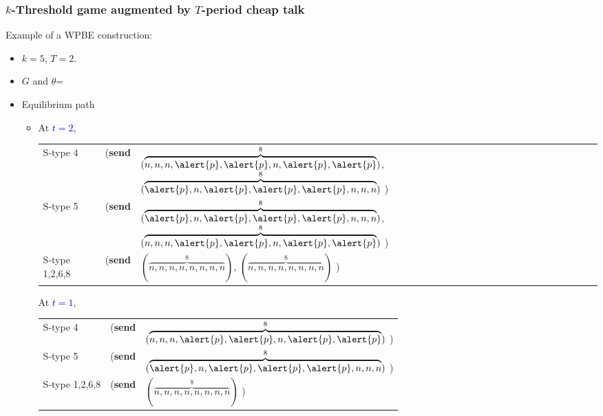 \documentclass[8pt]{beamer}
\begin{document}
\begin{frame}
  \frametitle{$k$-Threshold game augmented by $T$-period cheap talk}
Example of a WPBE construction:
\begin{itemize}
\item $k=5$, $T=2$.
\item $G$ and $\theta$=
\begin{center}
\end{center}
\end{itemize}

\begin{itemize}
\item Equilibrium path
\begin{itemize}
\item 
{}
{
At \textcolor{blue}{$t=2$}, 
\begin{table}[h]
\begin{tabular}{ll l}
S-type 4 & (\textbf{send} & $(\overbrace{n,n,n,\alert{p},\alert{p},n,\alert{p},\alert{p}}^{8})$, $(\overbrace{\alert{p},n,\alert{p},\alert{p},\alert{p},n,n,n}^{8})$ )\\
S-type 5 & (\textbf{send} & $(\overbrace{\alert{p},n,\alert{p},\alert{p},\alert{p},n,n,n}^{8})$, $(\overbrace{n,n,n,\alert{p},\alert{p},n,\alert{p},\alert{p}}^{8})$ )\\
S-type 1,2,6,8 & (\textbf{send} & $(\overbrace{n,n,n,n,n,n,n,n}^{8})$, $(\overbrace{n,n,n,n,n,n,n,n}^{8})$ )
\end{tabular}
\end{table}
}
{
At \textcolor{blue}{$t=1$}, 
\begin{table}[h]
\begin{tabular}{ll l}
S-type 4 & (\textbf{send} & $(\overbrace{n,n,n,\alert{p},\alert{p},n,\alert{p},\alert{p}}^{8})$ )\\
S-type 5 & (\textbf{send} & $(\overbrace{\alert{p},n,\alert{p},\alert{p},\alert{p},n,n,n}^{8})$ )\\
S-type 1,2,6,8 & (\textbf{send} & $(\overbrace{n,n,n,n,n,n,n,n}^{8})$ )
\end{tabular}
\end{table}
}


\end{itemize}
\end{itemize}
\end{frame}
\end{document}
